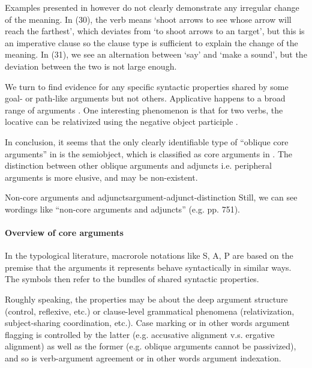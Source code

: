 \documentclass[a4paper, oneside, 12pt]{report}
\newcommand*{\citesec}[1]{\S~{#1}}
\newcommand*{\citepage}[1]{p.~{#1}}
\newcommand{\translate}[1]{`#1'}
\begin{document}
Examples presented in \citet[\citesec{22.1.2.2}]{jacques2021grammar}
however do not clearly demonstrate any irregular change of the meaning.
In (30), the verb means \translate{shoot arrows to see whose arrow will reach the farthest},
which deviates from \translate{to shoot arrows to an target},
but this is an imperative clause so the clause type is sufficient to explain the change of the meaning.
In (31), we see an alternation between
\translate{say} and \translate{make a sound},
but the deviation between the two is not large enough. 

We turn to find evidence for any specific syntactic properties
shared by some goal- or path-like arguments but not others.
Applicative happens to a broad range of arguments 
\citep[\citepage{859}]{jacques2021grammar}.
One interesting phenomenon is that for two verbs,
the locative can be relativized using the negative object participle 
\citep[\citesec{23.5.5.2}]{jacques2021grammar}.

In conclusion, it seems that the only clearly identifiable type of ``oblique core arguments'' 
in 
is the semiobject,
which is classified as core arguments in \citet{jacques2021grammar}.
The distinction between other oblique arguments and adjuncts i.e. peripheral arguments
is more elusive, and may be non-existent.

\begin{todobox}{Non-core arguments and adjuncts}{argument-adjunct-distinction}
Still, we can see wordings like ``non-core arguments and adjuncts''
(e.g. pp. 751).
\end{todobox}

\paragraph*{Overview of core arguments}
In the typological literature, macrorole notations like S, A, P 
are based on the premise that the arguments it represents
behave syntactically in similar ways.
The symbols then refer to the bundles of shared syntactic properties.

Roughly speaking, the properties may be about the deep argument structure
(control, reflexive, etc.) or clause-level grammatical phenomena
(relativization, subject-sharing coordination, etc.).
Case marking or in other words argument flagging 
is controlled by the latter (e.g. accusative alignment v.s. ergative alignment)
as well as the former (e.g. oblique arguments cannot be passivized),
and so is verb-argument agreement or in other words argument indexation.
\end{document}
